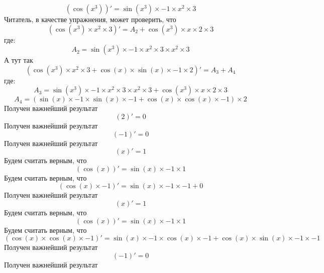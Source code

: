 \documentclass{article}
\begin{document}
\[(\cos( x ^{ 3 }))' = \sin( x ^{ 3 })\times -1 \times x ^{ 2 }\times 3 \]\newline
Читатель, в качестве упражнения, может проверить, что\newline
\[(\cos( x ^{ 3 })\times x ^{ 2 }\times 3 )' =  A_2 +\cos( x ^{ 3 })\times x \times 2 \times 3 \]\newline
где:\[A_2 = \sin( x ^{ 3 })\times -1 \times x ^{ 2 }\times 3 \times x ^{ 2 }\times 3 \]\newline
А тут так\newline
\[(\cos( x ^{ 3 })\times x ^{ 2 }\times 3 +\cos( x )\times\sin( x )\times -1 \times 2 )' =  A_3 + A_4 \]\newline
где:\[A_3 = \sin( x ^{ 3 })\times -1 \times x ^{ 2 }\times 3 \times x ^{ 2 }\times 3 +\cos( x ^{ 3 })\times x \times 2 \times 3 \]\newline
\[A_4 = (\sin( x )\times -1 \times\sin( x )\times -1 +\cos( x )\times\cos( x )\times -1 )\times 2 \]\newline
Получен важнейший результат\newline
\[( 2 )' =  0 \]\newline
Получен важнейший результат\newline
\[( -1 )' =  0 \]\newline
Получен важнейший результат\newline
\[( x )' =  1 \]\newline
Будем считать верным, что\newline
\[(\cos( x ))' = \sin( x )\times -1 \times 1 \]\newline
Будем считать верным, что\newline
\[(\cos( x )\times -1 )' = \sin( x )\times -1 \times -1 + 0 \]\newline
Получен важнейший результат\newline
\[( x )' =  1 \]\newline
Будем считать верным, что\newline
\[(\cos( x ))' = \sin( x )\times -1 \times 1 \]\newline
Будем считать верным, что\newline
\[(\cos( x )\times\cos( x )\times -1 )' = \sin( x )\times -1 \times\cos( x )\times -1 +\cos( x )\times\sin( x )\times -1 \times -1 \]\newline
Получен важнейший результат\newline
\[( -1 )' =  0 \]\newline
Получен важнейший результат\newline
\end{document}

